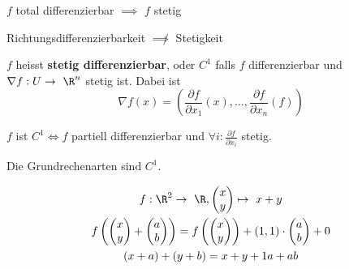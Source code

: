 \begin{fakt}
	$f$ total differenzierbar $\implies$ $f$ stetig
\end{fakt}
\begin{fakt}
	Richtungsdifferenzierbarkeit $\not\implies$ Stetigkeit
\end{fakt}
\begin{def*}[note = stetig differenzierbar , index = stetig differenzierbar , indexformat = {1!~2 2!1~}]
	$f$ heisst \textbf{stetig differenzierbar}, oder $C^1$ falls $f$ differenzierbar und $\nabla f : U \rightarrow \R^n$ stetig ist. Dabei ist 
	\[ \nabla f(x) = \left( \frac{\partial f}{\partial x_1}(x) , \dotsc , \frac{\partial f}{\partial x_n}(f) \right) \]
\end{def*}
\begin{fakt}
	$f$ ist $C^1 \iff f$ partiell differenzierbar und $\forall i : \frac{\partial f}{\partial x_i}$ stetig.
\end{fakt}
\begin{fakt}
	Die Grundrechenarten sind $C^1$.
\end{fakt}
\begin{bsp*}
	\begin{gather*}
		f: \R^2 \rightarrow \R , \begin{pmatrix} x \\ y \end{pmatrix} \mapsto x + y \\
		f \left( \begin{pmatrix} x \\ y \end{pmatrix} + \begin{pmatrix} a \\ b \end{pmatrix} \right)  = f \left( \begin{pmatrix} x \\ y \end{pmatrix} \right) + (1,1) \cdot \begin{pmatrix} a \\ b \end{pmatrix} + 0 \\
		(x+a) + (y+b) = x+y + 1a + ab
	\end{gather*}
\end{bsp*}
